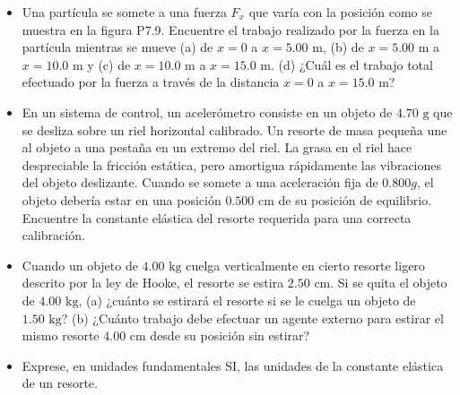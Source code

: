 \documentclass[11pt,a4paper]{article}
\begin{document}
\begin{itemize}
    \item[\textbf{9.}] Una partícula se somete a una fuerza $F_x$ que varía con la posición como se muestra en la figura P7.9. Encuentre el trabajo realizado por la fuerza en la partícula mientras se mueve (a) de $x = 0$ a $x = 5.00 \text{ m}$, (b) de $x = 5.00 \text{ m}$ a $x = 10.0 \text{ m}$ y (c) de $x = 10.0 \text{ m}$ a $x = 15.0 \text{ m}$. (d) ¿Cuál es el trabajo total efectuado por la fuerza a través de la distancia $x = 0$ a $x = 15.0 \text{ m}$?
    \vspace*{6cm}

    \item[\textbf{10.}] En un sistema de control, un acelerómetro consiste en un objeto de $4.70 \text{ g}$ que se desliza sobre un riel horizontal calibrado. Un resorte de masa pequeña une al objeto a una pestaña en un extremo del riel. La grasa en el riel hace despreciable la fricción estática, pero amortigua rápidamente las vibraciones del objeto deslizante. Cuando se somete a una aceleración fija de $0.800g$, el objeto debería estar en una posición $0.500 \text{ cm}$ de su posición de equilibrio. Encuentre la constante elástica del resorte requerida para una correcta calibración.
    \vspace*{6cm}

    \item[\textbf{11.}] Cuando un objeto de $4.00 \text{ kg}$ cuelga verticalmente en cierto resorte ligero descrito por la ley de Hooke, el resorte se estira $2.50 \text{ cm}$. Si se quita el objeto de $4.00 \text{ kg}$, (a) ¿cuánto se estirará el resorte si se le cuelga un objeto de $1.50 \text{ kg}$? (b) ¿Cuánto trabajo debe efectuar un agente externo para estirar el mismo resorte $4.00 \text{ cm}$ desde su posición sin estirar?
    \vspace*{6cm}

    \item[\textbf{12.}] Exprese, en unidades fundamentales SI, las unidades de la constante elástica de un resorte.
    \vspace*{5cm}
\end{itemize}

\newpage
\end{document}
